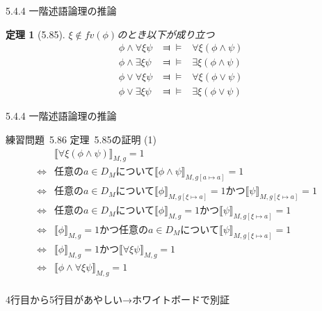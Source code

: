 \documentclass[dvipdfmx,11pt]{beamer}
\newtheorem{theo}[theorem]{定理}
\begin{document}
\begin{frame}{5.4.4 一階述語論理の推論}
  \begin{theo}[5.85]
    \(\xi\not\in\textit{fv}(\phi)\)のとき以下が成り立つ
    \begin{eqnarray*}
      \phi\wedge\forall\xi\psi & \Dashv\vDash & \forall\xi(\phi\wedge\psi) \\
      \phi\wedge\exists\xi\psi & \Dashv\vDash & \exists\xi(\phi\wedge\psi) \\
      \phi\vee\forall\xi\psi & \Dashv\vDash & \forall\xi(\phi\vee\psi) \\
      \phi\vee\exists\xi\psi & \Dashv\vDash & \exists\xi(\phi\vee\psi)
    \end{eqnarray*}
  \end{theo}
\end{frame}

\begin{frame}{5.4.4 一階述語論理の推論}
  \begin{block}{練習問題~5.86}
    定理~5.85の証明 (1)
    \[
    \begin{array}{rll}
      & \llbracket \forall \xi (\phi \wedge \psi) \rrbracket_{M,g} = 1 & \\
      \iff & \textit{任意の}a \in D_M\textit{について} \llbracket \phi \wedge \psi \rrbracket_{M,g[a\mapsto a]} = 1 & \\
      \iff & \textit{任意の}a \in D_M\textit{について} \llbracket \phi \rrbracket_{M,g[\xi\mapsto a]} = 1 \textit{かつ} \llbracket \psi \rrbracket_{M,g[\xi\mapsto a]} = 1 & \\
      \iff & \textit{任意の}a \in D_M\textit{について} \llbracket \phi \rrbracket_{M,g} = 1 \textit{かつ} \llbracket \psi \rrbracket_{M,g[\xi\mapsto a]} = 1 & \\
      \iff & \llbracket \phi \rrbracket_{M,g} = 1 \textit{かつ} \textit{任意の}a \in D_M\textit{について} \llbracket \psi \rrbracket_{M,g[\xi\mapsto a]} = 1 & \\
      \iff & \llbracket \phi \rrbracket_{M,g} = 1 \textit{かつ} \llbracket \forall \xi \psi \rrbracket_{M,g} = 1 & \\
      \iff & \llbracket \phi \wedge \forall \xi \psi \rrbracket_{M,g} = 1 & \\
    \end{array}
    \]
  \end{block}

  4行目から5行目があやしい→ホワイトボードで別証
\end{frame}
\end{document}
